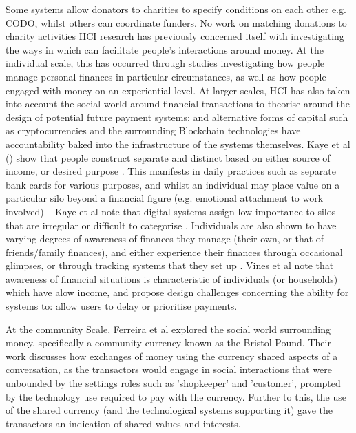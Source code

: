  Some systems allow donators to charities to specify conditions on each other e.g. CODO, whilst others can coordinate funders. No work on matching donations to charity activities
%
HCI research has previously concerned itself with investigating the ways in which can facilitate people's interactions around money. At the individual scale, this has occurred through studies investigating how people manage personal finances in particular circumstances, as well as how people engaged with money on an experiential level. At larger scales, HCI has also taken into account the social world around financial transactions to theorise around the design of potential future payment systems; and alternative forms of capital such as cryptocurrencies and the surrounding Blockchain technologies have accountability baked into the infrastructure of the systems themselves.
%
Kaye et al () show that people construct separate and distinct  based on either source of income, or desired purpose \cite{kaye_money_2014}. This manifests in daily practices such as separate bank cards for various purposes, and whilst an individual may place value on a particular silo beyond a financial figure (e.g. emotional attachment to work involved) -- Kaye et al note that digital systems assign low importance to silos that are irregular or difficult to categorise \cite{kaye_money_2014}. Individuals are also shown to have varying degrees of awareness of finances they manage (their own, or that of friends/family finances), and either experience their finances through occasional glimpses, or through tracking systems that they set up \cite{kaye_money_2014}. Vines et al note that awareness of financial situations is characteristic of individuals (or households) which have  alow income, and propose design challenges concerning the ability for systems to: allow users to delay or prioritise payments.

At the community Scale, Ferreira et al explored the social world surrounding money, specifically a community currency known as the Bristol Pound. Their work discusses how exchanges of money using the currency shared aspects of a conversation, as the transactors would engage in social interactions that were unbounded by the settings roles such as 'shopkeeper' and 'customer', prompted by the technology use required to pay with the currency. Further to this, the use of the shared currency (and the technological systems supporting it) gave the transactors an indication of shared values and interests.


